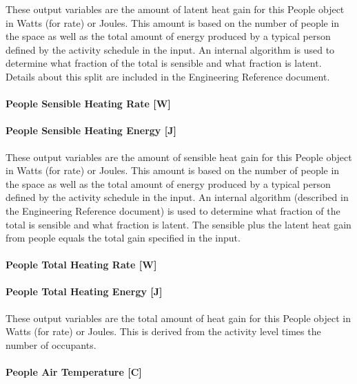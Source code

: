 These output variables are the amount of latent heat gain for this People object in Watts (for rate) or Joules. This amount is based on the number of people in the space as well as the total amount of energy produced by a typical person defined by the activity schedule in the input. An internal algorithm is used to determine what fraction of the total is sensible and what fraction is latent. Details about this split are included in the Engineering Reference document.

\paragraph{People Sensible Heating Rate {[}W{]}}\label{people-sensible-heating-rate-w}

\paragraph{People Sensible Heating Energy {[}J{]}}\label{people-sensible-heating-energy-j}

These output variables are the amount of sensible heat gain for this People object in Watts (for rate) or Joules. This amount is based on the number of people in the space as well as the total amount of energy produced by a typical person defined by the activity schedule in the input. An internal algorithm (described in the Engineering Reference document) is used to determine what fraction of the total is sensible and what fraction is latent. The sensible plus the latent heat gain from people equals the total gain specified in the input.

\paragraph{People Total Heating Rate {[}W{]}}\label{people-total-heating-rate-w}

\paragraph{People Total Heating Energy {[}J{]}}\label{people-total-heating-energy-j}

These output variables are the total amount of heat gain for this People object in Watts (for rate) or Joules. This is derived from the activity level times the number of occupants.

\paragraph{People Air Temperature {[}C{]}}\label{people-air-temperature-c}

